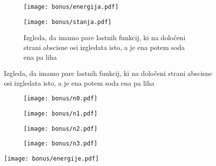 \documentclass{article}
\begin{document}
\begin{figure}[H]
\begin{subfigure}{.5\textwidth}
\texttt{[image: bonus/energija.pdf]}
\end{subfigure}
\begin{subfigure}{.5\textwidth}
\texttt{[image: bonus/stanja.pdf]}
\caption*{Izgleda, da imamo pare lastnih funkcij, ki na določeni strani abscisne osi izgledata isto, a je ena potem soda ena pa liha}
\end{subfigure}
\end{figure}
\begin{figure}[H]
\begin{subfigure}{.5\textwidth}
\texttt{[image: bonus/n0.pdf]}
\end{subfigure}
\begin{subfigure}{.5\textwidth}
\texttt{[image: bonus/n1.pdf]}
\end{subfigure}
\end{figure}
\begin{figure}[H]
\begin{subfigure}{.5\textwidth}
\texttt{[image: bonus/n2.pdf]}
\end{subfigure}
\begin{subfigure}{.5\textwidth}
\texttt{[image: bonus/n3.pdf]}
\end{subfigure}
\end{figure}
\begin{figure}[H]
\texttt{[image: bonus/energije.pdf]}
\end{figure}
\end{document}
